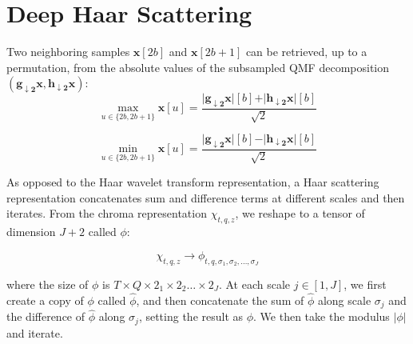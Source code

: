 \documentclass{article}
\begin{document}

\section{Deep Haar Scattering}\label{sec:scattering}

Two neighboring samples $\boldsymbol{x}[2b]$ and $\boldsymbol{x}[2b+1]$ can
be retrieved, up to a permutation, from the absolute values of the subsampled QMF
decomposition $(\boldsymbol{g_{\downarrow 2}x}, \boldsymbol{h_{\downarrow 2}x})$:
\begin{equation}
\max_{u\in\{2b, 2b+1\}} \boldsymbol{x}[u] =
\dfrac{\vert \boldsymbol{g_{\downarrow 2}x}\vert [b]+
\vert \boldsymbol{h_{\downarrow 2}x}\vert [b]}{\sqrt{2}}
\end{equation}

\begin{equation}
\min_{u\in\{2b, 2b+1\}} \boldsymbol{x}[u] =
\dfrac{
\vert \boldsymbol{g_{\downarrow 2}x} \vert [b] - 
\vert \boldsymbol{h_{\downarrow 2}x} \vert [b]}{\sqrt{2}}
\end{equation}

	As opposed to the Haar wavelet transform representation, a Haar scattering representation concatenates sum and difference terms at different scales and then iterates. From the chroma representation $\chi_{t,q,z}$, we reshape to a tensor of dimension $J+2$ called $\phi$:
	
	\begin {equation}
	\chi_{t,q,z} \rightarrow \phi_{t,q,\sigma_1, \sigma_2, \ldots , \sigma_J}
	\end{equation}
	
	where the size of $\phi$ is $T \times Q \times 2_1 \times 2_2 \ldots \times 2_J$. At each scale $j \in [1, J]$, we first create a copy of $\phi$ called $\hat{\phi}$, and then concatenate the sum of $\hat{\phi}$ along scale $\sigma_j$ and the difference of $\hat{\phi}$ along $\sigma_j$, setting the result as $\phi$. We then take the modulus $| \phi | $ and iterate. 
	
\end{document}
